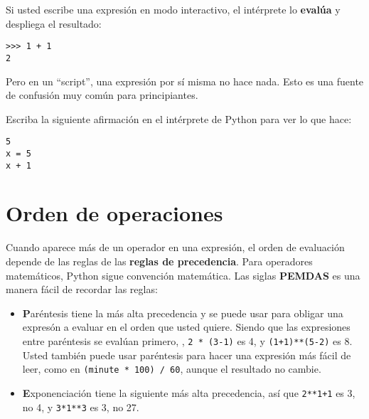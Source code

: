 Si usted escribe una expresi\'on en modo interactivo, el int\'erprete lo
{\bf eval\'ua} y despliega el resultado:


\beforeverb
\begin{verbatim}
>>> 1 + 1
2
\end{verbatim}
\afterverb
%

Pero en un ``script'', una expresi\'on por s\'i misma no hace nada. Esto es una fuente de confusi\'on muy com\'un para principiantes.

\begin{ex}
Escriba la siguiente afirmaci\'on en el int\'erprete de Python para ver lo que hace:


\begin{ex}


\beforeverb
\begin{verbatim}
5
x = 5
x + 1
\end{verbatim}
\afterverb
%
\end{ex}



\section{Orden de operaciones}



Cuando aparece m\'as de un operador en una expresi\'on, el orden de evaluaci\'on depende de las reglas de las {\bf reglas de precedencia}.  Para operadores matem\'aticos, Python sigue convenci\'on matem\'atica.
Las siglas {\bf PEMDAS} es una manera f\'acil de recordar las reglas:



\begin{itemize}


\item {\bf P}ar\'entesis tiene la m\'as alta precedencia y se puede usar para obligar una expres\'on a evaluar en el orden que usted quiere. Siendo que las expresiones entre par\'entesis se eval\'uan primero, , {\tt 2 * (3-1)} es 4,
y {\tt (1+1)**(5-2)} es 8. Usted tambi\'en puede usar par\'entesis para hacer una expresi\'on m\'as f\'acil de leer, como en  {\tt (minute * 100) / 60}, aunque el resultado no cambie.

\item {\bf E}xponenciaci\'on tiene la siguiente m\'as alta precedencia, as\'i que 
{\tt 2**1+1} es 3, no 4, y {\tt 3*1**3} es 3, no 27.


\end{itemize}
\end{ex}
